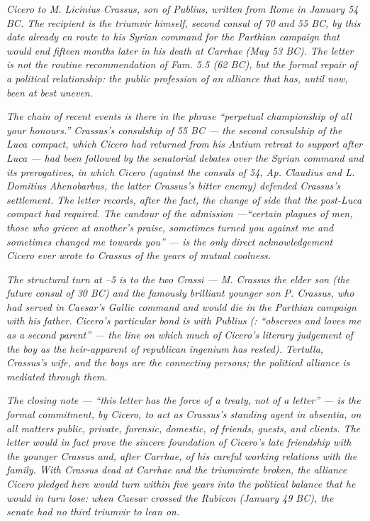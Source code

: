 
\textit{Cicero to M. Licinius Crassus, son of Publius, written
from Rome in January 54 BC. The recipient is the triumvir
himself, second consul of 70 and 55 BC, by this date already
en route to his Syrian command for the Parthian campaign that
would end fifteen months later in his death at Carrhae (May
53 BC). The letter is not the routine recommendation of
\textit{Fam.} 5.5 (62 BC), but the formal repair of a
political relationship: the public profession of an alliance
that has, until now, been at best uneven.}

\textit{The chain of recent events is there in the
 phrase ``perpetual championship of all your
honours.'' Crassus's consulship of 55 BC --- the second
consulship of the Luca compact, which Cicero had returned
from his Antium retreat to support after Luca --- had been
followed by the senatorial debates over the Syrian command
and its prerogatives, in which Cicero (against the consuls of
54, Ap. Claudius and L. Domitius Ahenobarbus, the latter
Crassus's bitter enemy) defended Crassus's settlement. The
letter records, after the fact, the change of side that the
post-Luca compact had required. The candour of the
 admission ---``certain plagues of men, those
who grieve at another's praise, sometimes turned you against
me and sometimes changed me towards you'' --- is the only
direct acknowledgement Cicero ever wrote to Crassus of the
years of mutual coolness.}

\textit{The structural turn at --5 is to the
two Crassi --- M. Crassus the elder son (the future consul of
30 BC) and the famously brilliant younger son P. Crassus, who
had served in Caesar's Gallic command and would die in the
Parthian campaign with his father. Cicero's particular bond
is with Publius (: ``observes and loves me as a
second parent'' --- the line on which much of Cicero's
literary judgement of the boy as the heir-apparent of
republican \textit{ingenium} has rested). Tertulla,
Crassus's wife, and the boys are the connecting persons; the
political alliance is mediated through them.}

\textit{The closing note --- ``this letter has the force of a
treaty, not of a letter'' --- is the formal commitment, by
Cicero, to act as Crassus's standing agent in absentia, on
all matters public, private, forensic, domestic, of friends,
guests, and clients. The letter would in fact prove the
sincere foundation of Cicero's late friendship with the
younger Crassus and, after Carrhae, of his careful working
relations with the family. With Crassus dead at Carrhae and
the triumvirate broken, the alliance Cicero pledged here would
turn within five years into the political balance that he
would in turn lose: when Caesar crossed the Rubicon (January
49 BC), the senate had no third triumvir to lean on.}
